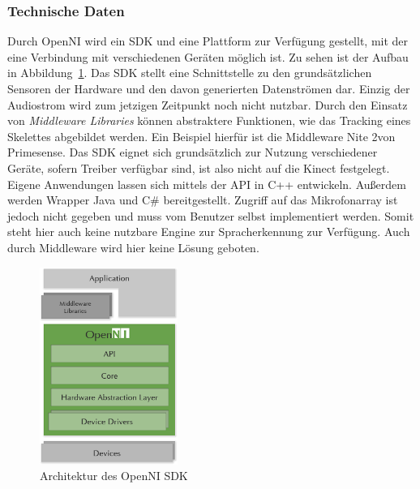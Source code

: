 
\subsubsection{Technische Daten}

Durch OpenNI wird ein SDK und eine Plattform zur Verf\"ugung gestellt, mit der eine Verbindung mit verschiedenen Ger\"aten m\"oglich ist. Zu sehen ist der Aufbau in Abbildung~\ref{fig:opennisdk}.
Das SDK stellt eine Schnittstelle zu den grunds\"atzlichen Sensoren der Hardware und den davon generierten Datenstr\"omen dar.
Einzig der Audiostrom wird zum jetzigen Zeitpunkt noch nicht nutzbar.
Durch den Einsatz von \textit{Middleware Libraries} k\"onnen abstraktere Funktionen, wie das Tracking eines Skelettes abgebildet werden. Ein Beispiel 
hierf\"ur ist die Middleware Nite 2\footnotemark[10] von Primesense. Das SDK eignet sich grunds\"atzlich zur Nutzung verschiedener Ger\"ate, 
sofern Treiber verf\"ugbar sind, ist also nicht auf die Kinect festgelegt.
Eigene Anwendungen lassen sich mittels der API in C++ entwickeln. Außerdem werden \gls{Wrapper} Java und C\# bereitgestellt.
Zugriff auf das Mikrofonarray ist jedoch nicht gegeben und muss vom Benutzer selbst implementiert werden. 
Somit steht hier auch keine nutzbare Engine zur Spracherkennung zur Verf\"ugung.
Auch durch Middleware wird hier keine L\"osung geboten.

\begin{figure}[!]
\centering
\includegraphics[width=0.4\textwidth]{img/04kapitel/OpenNI2_Architecture2.png}
\caption[Kinect Explorer]{Architektur des OpenNI SDK\footnotemark[8]}
\label{fig:opennisdk}
\end{figure}

